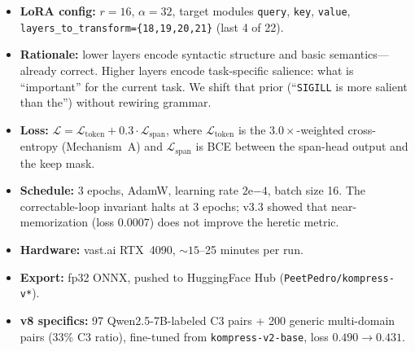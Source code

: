 \begin{itemize}
  \item \textbf{LoRA config:} $r{=}16$, $\alpha{=}32$, target modules
        \texttt{query}, \texttt{key}, \texttt{value},
        \texttt{layers\_to\_transform=\{18,19,20,21\}} (last 4 of 22).
  \item \textbf{Rationale:} lower layers encode syntactic structure and basic
        semantics---already correct. Higher layers encode task-specific
        salience: what is ``important'' for the current task. We shift that
        prior (``\texttt{SIGILL} is more salient than the'') without rewiring
        grammar.
  \item \textbf{Loss:} $\mathcal{L} = \mathcal{L}_{\mathrm{token}} + 0.3
        \cdot \mathcal{L}_{\mathrm{span}}$, where
        $\mathcal{L}_{\mathrm{token}}$ is the $3.0\times$-weighted
        cross-entropy (Mechanism~A) and $\mathcal{L}_{\mathrm{span}}$ is BCE
        between the span-head output and the keep mask.
  \item \textbf{Schedule:} 3 epochs, AdamW, learning rate $2\mathrm{e}{-4}$,
        batch size 16. The correctable-loop invariant halts at 3 epochs;
        v3.3 showed that near-memorization (loss $0.0007$) does not improve
        the heretic metric.
  \item \textbf{Hardware:} vast.ai RTX~4090, ${\sim}15$--25
        minutes per run.
  \item \textbf{Export:} fp32 ONNX, pushed to HuggingFace Hub
        (\texttt{PeetPedro/kompress-v*}).
  \item \textbf{v8 specifics:} 97 Qwen2.5-7B-labeled C3 pairs + 200 generic
        multi-domain pairs (33\% C3 ratio), fine-tuned from
        \texttt{kompress-v2-base}, loss $0.490\to0.431$.
\end{itemize}
